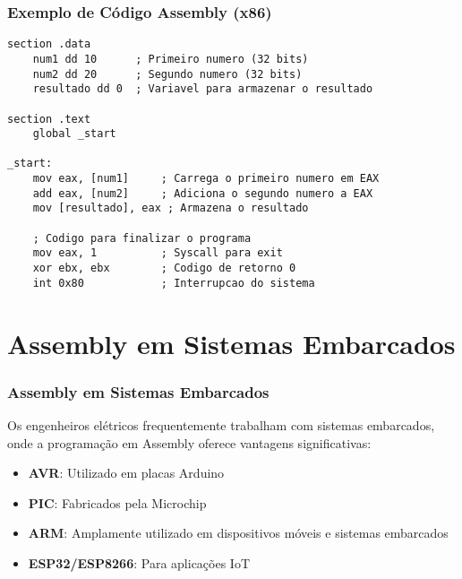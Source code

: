 \documentclass[11pt]{beamer}
\begin{document}
\begin{frame}[fragile]
\frametitle{Exemplo de Código Assembly (x86)}

\begin{lstlisting}[language={[x86masm]Assembler}, basicstyle=\tiny]
section .data
    num1 dd 10      ; Primeiro numero (32 bits)
    num2 dd 20      ; Segundo numero (32 bits)
    resultado dd 0  ; Variavel para armazenar o resultado

section .text
    global _start

_start:
    mov eax, [num1]     ; Carrega o primeiro numero em EAX
    add eax, [num2]     ; Adiciona o segundo numero a EAX
    mov [resultado], eax ; Armazena o resultado
    
    ; Codigo para finalizar o programa
    mov eax, 1          ; Syscall para exit
    xor ebx, ebx        ; Codigo de retorno 0
    int 0x80            ; Interrupcao do sistema
\end{lstlisting}

\end{frame}

\section{Assembly em Sistemas Embarcados}

\begin{frame}
\frametitle{Assembly em Sistemas Embarcados}

Os engenheiros elétricos frequentemente trabalham com sistemas embarcados, onde a programação em Assembly oferece vantagens significativas:

\begin{itemize}
    \item \textbf{AVR}: Utilizado em placas Arduino
    \item \textbf{PIC}: Fabricados pela Microchip
    \item \textbf{ARM}: Amplamente utilizado em dispositivos móveis e sistemas embarcados
    \item \textbf{ESP32/ESP8266}: Para aplicações IoT
\end{itemize}

\end{frame}
\end{document}
